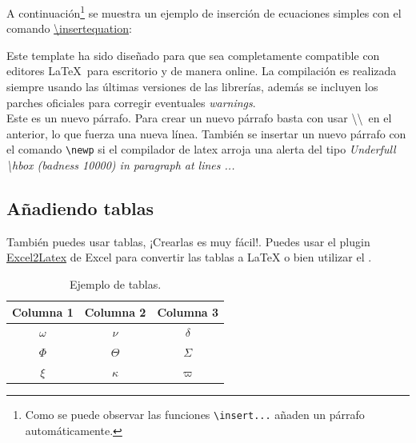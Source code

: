 	A continuación\footnote{Como se puede observar las funciones \texttt{\textbackslash insert...} añaden un párrafo automáticamente.} se muestra un ejemplo de inserción de ecuaciones simples con el comando \href{https://template-latex.github.io/informe.html#hlp-formulae}{\textbackslash insertequation}:


	Este template ha sido diseñado para que sea completamente compatible con editores \LaTeX\ para escritorio y de manera online. La compilación es realizada siempre usando las últimas versiones de las librerías, además se incluyen los parches oficiales para corregir eventuales \textit{warnings}. \\

	Este es un nuevo párrafo. Para crear un nuevo párrafo basta con usar \textbackslash\textbackslash\ en el anterior, lo que fuerza una nueva línea. También se insertar un nuevo párrafo con el comando \texttt{\textbackslash newp} si el compilador de latex arroja una alerta del tipo \textit{Underfull \textbackslash hbox (badness 10000) in paragraph at lines ...}

\subsection{Añadiendo tablas}

	También puedes usar tablas, ¡Crearlas es muy fácil!. Puedes usar el plugin \href{https://www.ctan.org/tex-archive/support/excel2latex}{Excel2Latex} \cite{excel2latex} de Excel para convertir las tablas a \LaTeX\xspace o bien utilizar el  \cite{tablesgenerator}.

	\begin{table}[H]
		\centering
		\caption{Ejemplo de tablas.}
		\begin{tabular}{ccc}
			\hline
			\textbf{Columna 1} & \textbf{Columna 2} & \textbf{Columna 3} \bigstrut\\
			\hline
			$\omega$ & $\nu$ & $\delta$ \bigstrut[t]\\
			$\Phi$ & $\Theta$ & $\varSigma$ \\
			$\xi$ & $\kappa$ & $\varpi$ \bigstrut[b] \\
			\hline
		\end{tabular}
		\label{tab:tabla-1}
	\end{table}


